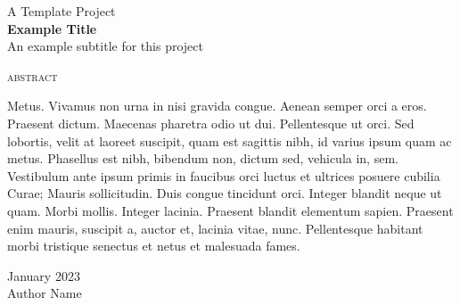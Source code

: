 \documentclass[a4paper,10pt]{report}
\newcommand\authorname{Author Name}
\begin{document}
\begin{titlepage}
    \centering
    \vspace*{3.5cm}
    \large{A Template Project}\\
    \huge\textbf{Example Title}\\
    \large{An example subtitle for this project}

    \vfill
    \textsc{abstract}
    \vspace{.1cm}

    \begin{minipage}{.8\linewidth}
        Metus. Vivamus non urna in nisi gravida congue. Aenean semper orci a
        eros. Praesent dictum. Maecenas pharetra odio ut dui. Pellentesque ut
        orci. Sed lobortis, velit at laoreet suscipit, quam est sagittis nibh,
        id varius ipsum quam ac metus. Phasellus est nibh, bibendum non, dictum
        sed, vehicula in, sem. Vestibulum ante ipsum primis in faucibus orci
        luctus et ultrices posuere cubilia Curae; Mauris sollicitudin. Duis
        congue tincidunt orci. Integer blandit neque ut quam. Morbi mollis.
        Integer lacinia. Praesent blandit elementum sapien. Praesent enim
        mauris, suscipit a, auctor et, lacinia vitae, nunc. Pellentesque
        habitant morbi tristique senectus et netus et malesuada fames.
    \end{minipage}

    \vspace{1.5cm}

    January 2023\\
    \vspace{.25cm}
    \Large\authorname 
    \vspace{4.5cm}
\end{titlepage}


% 
\end{document}
